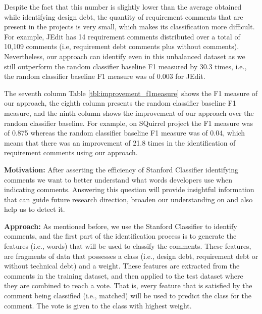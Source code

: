 Despite the fact that this number is slightly lower than the average obtained while identifying design debt, the quantity of requirement \SATD comments that are present in the projects is very small, which makes its classification more difficult. For example, JEdit has 14 requirement \SATD comments distributed over a total of 10,109 comments (i.e, requirement debt comments plus without \SATD comments). Nevertheless, our approach can identify \SATD even in this unbalanced dataset as we still outperform the random classifier baseline F1 measured by 30.3 times, i.e., the random classifier baseline F1 measure was of 0.003 for JEdit. 

The seventh column Table \ref{tbl:improvement_f1measure} shows the F1 measure of our approach, the eighth column presents the random classifier baseline F1 measure, and the ninth column shows the improvement of our approach over the random classifier baseline. For example, on SQuirrel project the F1 measure was of 0.875 whereas the random classifier baseline F1 measure was of 0.04, which means that there was an improvement of 21.8 times in the identification of requirement \SATD comments using our approach. 



\vspace{3mm}
\noindent\rqii
\vspace{3mm}

\noindent \textbf{Motivation:} After asserting the efficiency of Stanford Classifier identifying \SATD comments we want to better understand what words developers use when indicating \SATD comments. Answering this question will provide insightful information that can guide future research direction, broaden our understanding on \SATD and also help us to detect it.     

\vspace{1mm}
\noindent \textbf{Approach:} As mentioned before, we use the Stanford Classifier to identify \SATD comments, and the first part of the identification process is to generate the features (i.e., words) that will be used to classify the comments. These features, are fragments of data that possesses a class (i.e., design debt, requirement debt or without technical debt) and a weight. These features are extracted from the comments in the training dataset, and then applied to the test dataset where they are combined to reach a vote. That is, every feature that is satisfied by the comment being classified (i.e., matched) will be used to predict the class for the comment. The vote is given to the class with highest weight. 

